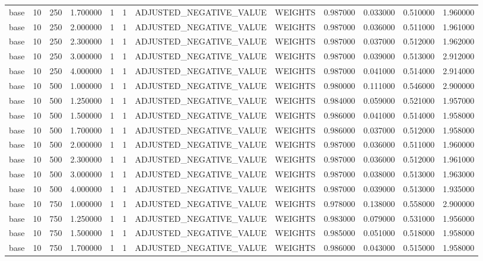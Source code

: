 \begin{tabular}{lrrrllllrrrr}
base & 10 & 250 & 1.700000 & 1 & 1 & ADJUSTED_NEGATIVE_VALUE & WEIGHTS & 0.987000 & 0.033000 & 0.510000 & 1.960000 \\
base & 10 & 250 & 2.000000 & 1 & 1 & ADJUSTED_NEGATIVE_VALUE & WEIGHTS & 0.987000 & 0.036000 & 0.511000 & 1.961000 \\
base & 10 & 250 & 2.300000 & 1 & 1 & ADJUSTED_NEGATIVE_VALUE & WEIGHTS & 0.987000 & 0.037000 & 0.512000 & 1.962000 \\
base & 10 & 250 & 3.000000 & 1 & 1 & ADJUSTED_NEGATIVE_VALUE & WEIGHTS & 0.987000 & 0.039000 & 0.513000 & 2.912000 \\
base & 10 & 250 & 4.000000 & 1 & 1 & ADJUSTED_NEGATIVE_VALUE & WEIGHTS & 0.987000 & 0.041000 & 0.514000 & 2.914000 \\
base & 10 & 500 & 1.000000 & 1 & 1 & ADJUSTED_NEGATIVE_VALUE & WEIGHTS & 0.980000 & 0.111000 & 0.546000 & 2.900000 \\
base & 10 & 500 & 1.250000 & 1 & 1 & ADJUSTED_NEGATIVE_VALUE & WEIGHTS & 0.984000 & 0.059000 & 0.521000 & 1.957000 \\
base & 10 & 500 & 1.500000 & 1 & 1 & ADJUSTED_NEGATIVE_VALUE & WEIGHTS & 0.986000 & 0.041000 & 0.514000 & 1.958000 \\
base & 10 & 500 & 1.700000 & 1 & 1 & ADJUSTED_NEGATIVE_VALUE & WEIGHTS & 0.986000 & 0.037000 & 0.512000 & 1.958000 \\
base & 10 & 500 & 2.000000 & 1 & 1 & ADJUSTED_NEGATIVE_VALUE & WEIGHTS & 0.987000 & 0.036000 & 0.511000 & 1.960000 \\
base & 10 & 500 & 2.300000 & 1 & 1 & ADJUSTED_NEGATIVE_VALUE & WEIGHTS & 0.987000 & 0.036000 & 0.512000 & 1.961000 \\
base & 10 & 500 & 3.000000 & 1 & 1 & ADJUSTED_NEGATIVE_VALUE & WEIGHTS & 0.987000 & 0.038000 & 0.513000 & 1.963000 \\
base & 10 & 500 & 4.000000 & 1 & 1 & ADJUSTED_NEGATIVE_VALUE & WEIGHTS & 0.987000 & 0.039000 & 0.513000 & 1.935000 \\
base & 10 & 750 & 1.000000 & 1 & 1 & ADJUSTED_NEGATIVE_VALUE & WEIGHTS & 0.978000 & 0.138000 & 0.558000 & 2.900000 \\
base & 10 & 750 & 1.250000 & 1 & 1 & ADJUSTED_NEGATIVE_VALUE & WEIGHTS & 0.983000 & 0.079000 & 0.531000 & 1.956000 \\
base & 10 & 750 & 1.500000 & 1 & 1 & ADJUSTED_NEGATIVE_VALUE & WEIGHTS & 0.985000 & 0.051000 & 0.518000 & 1.958000 \\
base & 10 & 750 & 1.700000 & 1 & 1 & ADJUSTED_NEGATIVE_VALUE & WEIGHTS & 0.986000 & 0.043000 & 0.515000 & 1.958000 \\

\end{tabular}
